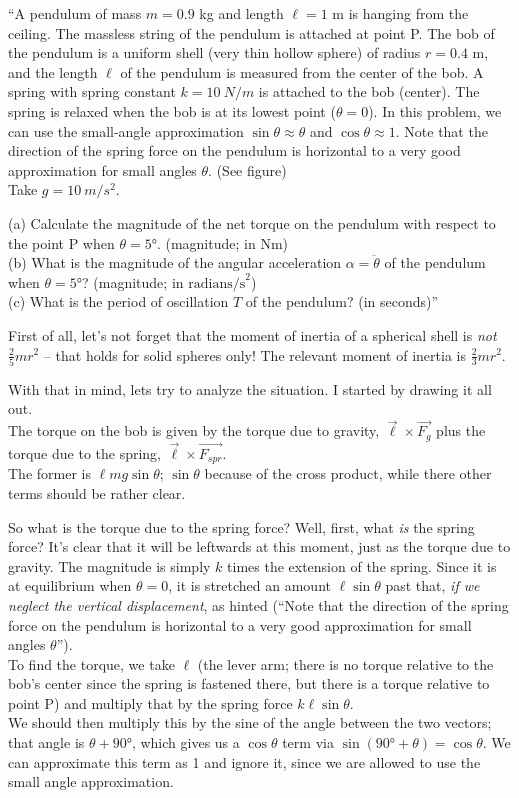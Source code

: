 \documentclass[8.01x]{subfiles}
\begin{document}
``A pendulum of mass $m = 0.9$  kg and length $\ell = 1$ m is hanging from the ceiling. The massless string of the pendulum is attached at point P. The bob of the pendulum is a uniform shell (very thin hollow sphere) of radius $r = 0.4$ m, and the length $\ell$ of the pendulum is measured from the center of the bob. A spring with spring constant $k = \SI{10}{N/m}$ is attached to the bob (center). The spring is relaxed when the bob is at its lowest point ($\theta = 0$). In this problem, we can use the small-angle approximation $\sin \theta \approx \theta$ and $\cos \theta \approx 1$. Note that the direction of the spring force on the pendulum is horizontal to a very good approximation for small angles $\theta$. (See figure)\\
Take $g = \SI{10}{m/s^2}$.

(a) Calculate the magnitude of the net torque on the pendulum with respect to the point P when $\theta = \ang{5}$. (magnitude; in Nm)\\
(b) What is the magnitude of the angular acceleration $\alpha = \ddot{\theta}$ of the pendulum when $\theta = \ang{5}$? (magnitude; in $\text{radians/s}^2$)\\
(c) What is the period of oscillation $T$ of the pendulum? (in seconds)''

First of all, let's not forget that the moment of inertia of a spherical shell is \emph{not} $\frac{2}{5} m r^2$ -- that holds for solid spheres only! The relevant moment of inertia is $\frac{2}{3} m r^2$.

With that in mind, lets try to analyze the situation. I started by drawing it all out.\\
The torque on the bob is given by the torque due to gravity, $\vec{\ell} \times \vec{F_g}$ plus the torque due to the spring, $\vec{\ell} \times \vec{F_{spr}}$.\\
The former is $\ell m g \sin \theta$; $\sin \theta$ because of the cross product, while there other terms should be rather clear.

So what is the torque due to the spring force? Well, first, what \emph{is} the spring force? It's clear that it will be leftwards at this moment, just as the torque due to gravity.
The magnitude is simply $k$ times the extension of the spring. Since it is at equilibrium when $\theta = 0$, it is stretched an amount $\ell \sin \theta$ past that, \emph{if we neglect the vertical displacement}, as hinted (``Note that the direction of the spring force on the pendulum is horizontal to a very good approximation for small angles $\theta$'').\\
To find the torque, we take $\ell$ (the lever arm; there is no torque relative to the bob's center since the spring is fastened there, but there is a torque relative to point P) and multiply that by the spring force $k \ell \sin \theta$.\\
We should then multiply this by the sine of the angle between the two vectors; that angle is $\theta + \ang{90}$, which gives us a $\cos \theta$ term via $\sin(\ang{90} + \theta) = \cos \theta$. We can approximate this term as 1 and ignore it, since we are allowed to use the small angle approximation.
\end{document}
